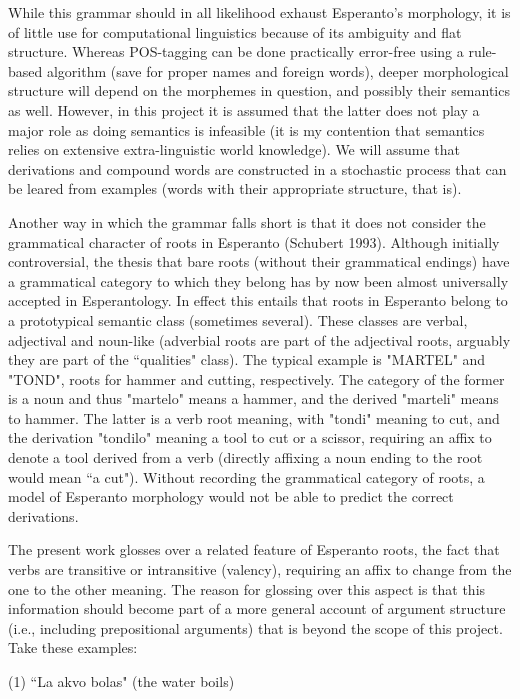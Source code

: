 \documentclass[10pt,a4paper]{article}
\begin{document}
While this grammar should in all likelihood exhaust Esperanto's morphology, 
it is of little use for computational linguistics because of its ambiguity
and flat structure.  Whereas POS-tagging can be done practically error-free
using a rule-based algorithm (save for proper names and foreign words), deeper
morphological structure will depend on the morphemes in question, and possibly
their semantics as well. However, in this project it is assumed that the latter
does not play a major role as doing semantics is infeasible (it is my
contention that semantics relies on extensive extra-linguistic world
knowledge). We will assume that derivations and compound words are constructed
in a stochastic process that can be leared from examples (words with their
appropriate structure, that is).

Another way in which the grammar falls short is that it does not consider the
grammatical character of roots in Esperanto (Schubert 1993). Although initially
controversial, the thesis that bare roots (without their grammatical endings)
have a grammatical category to which they belong has by now been almost
universally accepted in Esperantology. In effect this entails that roots in
Esperanto belong to a prototypical semantic class (sometimes several).  These
classes are verbal, adjectival and noun-like (adverbial roots are part of the
adjectival roots, arguably they are part of the ``qualities" class). The
typical example is "MARTEL" and "TOND", roots for hammer and cutting,
respectively. The category of the former is a noun and thus "martelo" means a
hammer, and the derived "marteli" means to hammer. The latter is a verb root
meaning, with "tondi" meaning to cut, and the derivation "tondilo" meaning a
tool to cut or a scissor, requiring an affix to denote a tool derived from a
verb (directly affixing a noun ending to the root would mean ``a cut"). Without
recording the grammatical category of roots, a model of Esperanto morphology
would not be able to predict the correct derivations.

The present work glosses over a related feature of Esperanto roots, the fact
that verbs are transitive or intransitive (valency), requiring an affix to
change from the one to the other meaning. The reason for glossing over this
aspect is that this information should become part of a more general account of
argument structure (i.e., including prepositional arguments) that is beyond the
scope of this project. Take these examples:

(1) ``La akvo bolas" (the water boils)
\end{document}
